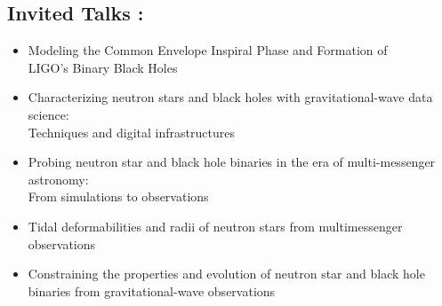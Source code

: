 \subsection{\textbf{Invited Talks :}}
\begin{addmargin}[1em]{0em}
{
  {
    \begin{itemize}
    \renewcommand{\labelitemi}{~}
    \item Modeling the Common Envelope Inspiral Phase and Formation of \\ LIGO’s Binary Black Holes
    \end{itemize}
  }
}

{
  {
    \begin{itemize}
    \renewcommand{\labelitemi}{~}
    \item Characterizing neutron stars and black holes with gravitational-wave data science: \\ Techniques and digital infrastructures
    \end{itemize}
  }
}

{
  {
    \begin{itemize}
    \renewcommand{\labelitemi}{~}
    \item Probing neutron star and black hole binaries in the era of multi-messenger astronomy: \\ From simulations to observations
    \end{itemize}
  }
}
\vspace*{1mm}

{
  {%
    \begin{itemize}
    \renewcommand{\labelitemi}{~}
    \item Tidal deformabilities and radii of neutron stars from multimessenger observations
    \end{itemize}
  }
}

{
  {\begin{itemize}
    \renewcommand{\labelitemi}{~}
    \item Constraining the properties and evolution of neutron star and black hole \\ binaries from gravitational-wave observations
    \end{itemize}
  }
}


\end{addmargin}

